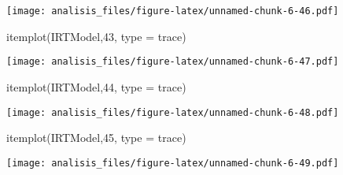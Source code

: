 \documentclass[
]{article}
\newenvironment{Shaded}{\begin{snugshade}}{\end{snugshade}}
\newcommand{\AttributeTok}[1]{\textcolor[rgb]{0.77,0.63,0.00}{#1}}
\newcommand{\DecValTok}[1]{\textcolor[rgb]{0.00,0.00,0.81}{#1}}
\newcommand{\FunctionTok}[1]{\textcolor[rgb]{0.00,0.00,0.00}{#1}}
\newcommand{\NormalTok}[1]{#1}
\newcommand{\StringTok}[1]{\textcolor[rgb]{0.31,0.60,0.02}{#1}}
\begin{document}
\texttt{[image: analisis\_files/figure-latex/unnamed-chunk-6-46.pdf]}

\begin{Shaded}
\begin{Highlighting}[]
\FunctionTok{itemplot}\NormalTok{(IRTModel,}\DecValTok{43}\NormalTok{, }\AttributeTok{type =} \StringTok{\textquotesingle{}trace\textquotesingle{}}\NormalTok{)}
\end{Highlighting}
\end{Shaded}

\texttt{[image: analisis\_files/figure-latex/unnamed-chunk-6-47.pdf]}

\begin{Shaded}
\begin{Highlighting}[]
\FunctionTok{itemplot}\NormalTok{(IRTModel,}\DecValTok{44}\NormalTok{, }\AttributeTok{type =} \StringTok{\textquotesingle{}trace\textquotesingle{}}\NormalTok{)}
\end{Highlighting}
\end{Shaded}

\texttt{[image: analisis\_files/figure-latex/unnamed-chunk-6-48.pdf]}

\begin{Shaded}
\begin{Highlighting}[]
\FunctionTok{itemplot}\NormalTok{(IRTModel,}\DecValTok{45}\NormalTok{, }\AttributeTok{type =} \StringTok{\textquotesingle{}trace\textquotesingle{}}\NormalTok{)}
\end{Highlighting}
\end{Shaded}

\texttt{[image: analisis\_files/figure-latex/unnamed-chunk-6-49.pdf]}
\end{document}
